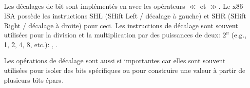 \subsection{\ShiftsSectionName}

Les décalages de bit sont implémentés en \CCpp avec les opérateurs $\ll$ et $\gg$.
Le x86 \ac{ISA} possède les instructions SHL (SHift Left / décalage à gauche) et
SHR (SHift Right / décalage à droite) pour ceci.
Les instructions de décalage sont souvent utilisées pour la division et la multiplication
par des puissances de deux: $2^{n}$ (e.g., 1, 2, 4, 8, etc.):
,
.


Les opérations de décalage sont aussi si importantes car elles sont souvent utilisées
pour isoler des bits spécifiques ou pour construire une valeur à partir de plusieurs
bits épars.
